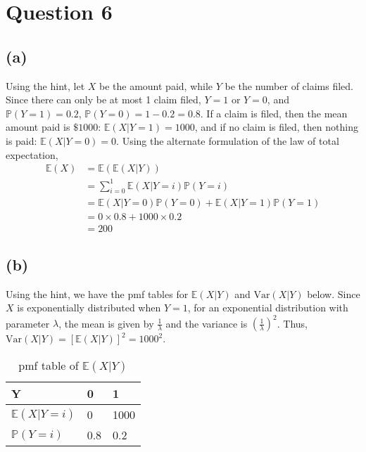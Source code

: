 \documentclass[12pt]{article}
\begin{document}
\newpage

\section*{Question 6}

\subsection*{(a)}

Using the hint, let $X$ be the amount paid, while $Y$ be the number of claims filed. Since there can only be at most 1 claim filed, $Y = 1$ or $Y = 0$, and $ \mathbb{P}(Y = 1) = 0.2$, $ \mathbb{P}(Y = 0) = 1-0.2 = 0.8$. If a claim is filed, then the mean amount paid is $\$1000$: $ \mathbb{E}(X | Y = 1) = 1000$, and if no claim is filed, then nothing is paid: $ \mathbb{E}(X | Y = 0) = 0$. Using the alternate formulation of the law of total expectation, \begin{align*}
    \mathbb{E}(X) &= \mathbb{E}(\mathbb{E}(X | Y)) \\ 
    &= \sum_{i=0}^{1} \mathbb{E}(X | Y = i) \mathbb{P}(Y = i) \\ 
    &= \mathbb{E}(X | Y = 0) \mathbb{P}(Y = 0) + \mathbb{E}(X | Y = 1) \mathbb{P}(Y = 1) \\ 
    &= 0 \times 0.8 + 1000 \times 0.2 \\ 
    &= \boxed{200}
\end{align*}

\subsection*{(b)}

Using the hint, we have the pmf tables for $ \mathbb{E}(X | Y)$ and $\text{Var}(X | Y)$ below. Since $X$ is exponentially distributed when $Y = 1$, for an exponential distribution with parameter $\lambda$, the mean is given by $\frac{1}{\lambda}$ and the variance is $ \left(\frac{1}{\lambda}\right)^{2}$. Thus, $\text{Var}(X | Y) = \left[ \mathbb{E}(X | Y) \right]^{2} = 1000^{2}$. 

\begin{table}[H]
    \centering
    \begin{tabular}{l | l | l}
        \hline Y & 0 & 1 \\ \hline 
        $ \mathbb{E}(X | Y = i)$ & 0 & 1000 \\ \hline 
        $ \mathbb{P}(Y = i)$ & 0.8 & 0.2 \\ \hline
    \end{tabular}
    \caption{pmf table of $ \mathbb{E}(X | Y)$}
    \label{tab:6-pmfexp}
\end{table}
\end{document}
